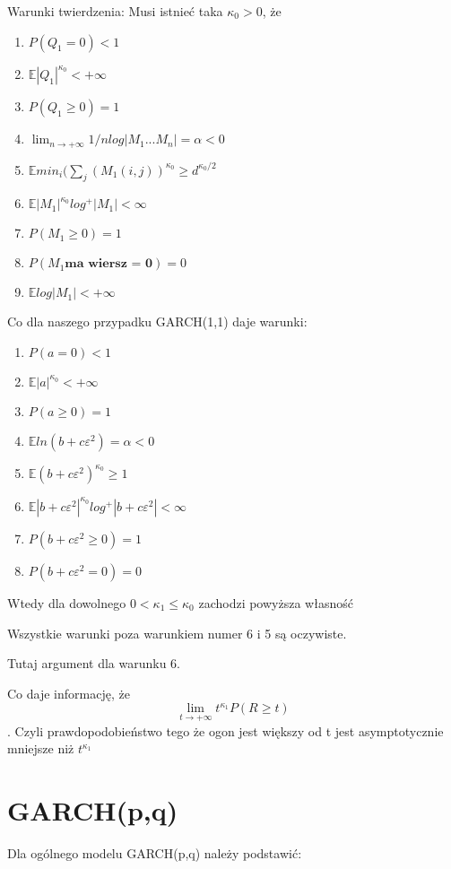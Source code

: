 \documentclass[12pt]{article}
\begin{document}
Warunki twierdzenia: Musi istnieć taka $\kappa_0 > 0$, że \begin{enumerate}
\item $P(Q_1=0) < 1$
\item $\mathbb{E}|Q_1|^{\kappa_0} < +\infty$
\item $P(Q_1 \geq 0) = 1$
\item $\lim_{n \rightarrow +\infty} 1/n log|M_1 ... M_n | = \alpha < 0$
\item $\mathbb{E}min_i(\sum_j(M_1(i,j))^{\kappa_0} \geq d^{\kappa_0/2}$
\item $\mathbb{E}|M_1|^{\kappa_0}log^+|M_1| < \infty$
\item $P(M_1 \geq 0) = 1$
\item $P(M_1 \textbf{ma wiersz = 0}) = 0$
\item $\mathbb{E}log|M_1| < +\infty$
\end{enumerate}

Co dla naszego przypadku GARCH(1,1) daje warunki: \begin{enumerate}
\item $P(a=0) < 1$
\item $\mathbb{E}|a|^{\kappa_0} < +\infty$
\item $P(a \geq 0) = 1$
\item $\mathbb{E}ln(b+c\varepsilon^2) = \alpha < 0$
\item $\mathbb{E}(b+c\varepsilon^2)^{\kappa_0} \geq 1$
\item $\mathbb{E}|b+c\varepsilon^2|^{\kappa_0}log^+|b+c\varepsilon^2| < \infty$
\item $P(b+c\varepsilon^2 \geq 0) = 1$
\item $P(b+c\varepsilon^2 = 0) = 0$
\end{enumerate}
Wtedy dla dowolnego $0 < \kappa_1 \leq \kappa_0$ zachodzi powyższa własność

Wszystkie warunki poza warunkiem numer 6 i 5 są oczywiste.

Tutaj argument dla warunku 6.

Co daje informację, że 
\[
\lim_{t \rightarrow +\infty} t^{\kappa_1}  P(R \geq t) 
\]. Czyli prawdopodobieństwo tego że ogon jest większy od t jest asymptotycznie mniejsze niż $t^{\kappa_1}$



\section{GARCH(p,q)}

Dla ogólnego modelu GARCH(p,q) należy podstawić:
\end{document}
